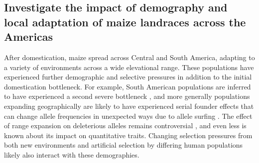 \vspace{-1ex}
\subsection{Investigate the impact of demography and local adaptation of maize landraces across the Americas} \vspace{-1ex}
\label{surfing}

After domestication, maize spread across Central and South America, adapting to a variety of environments across a wide elevational range. These populations have experienced further demographic and selective pressures in addition to the initial domestication bottleneck. For example, South American populations are inferred to have experienced a second severe bottleneck \citep{Takuno:2015eu}, and more generally populations expanding geographically are likely to have experienced serial founder effects that can change allele frequencies in unexpected ways due to allele surfing \citep{Klopfstein:2005bl}. The effect of range expansion on deleterious alleles remains controversial \citep{Henn:2015ce, Henn:2015dp, Simons:2014fj, Sudmant:2015}, and even less is known about its impact on quantitative traits. Changing selection pressures from both new environments and artificial selection by differing human populations likely also interact with these demographies. 


